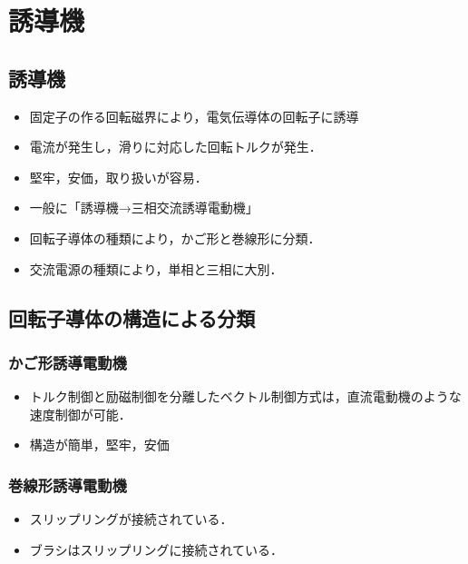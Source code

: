 \section{誘導機}
\subsection{誘導機}

\begin{classify}{}
\class
{
  \begin{classify}{}
\end{classify}
}
\end{classify}

\begin{itemize}
  \item 固定子の作る回転磁界により，電気伝導体の回転子に誘導
  \item 電流が発生し，滑りに対応した回転トルクが発生．
  \item 堅牢，安価，取り扱いが容易．
  \item 一般に「誘導機→三相交流誘導電動機」
  \item 回転子導体の種類により，かご形と巻線形に分類．
  \item 交流電源の種類により，単相と三相に大別．
\end{itemize}

\subsection{回転子導体の構造による分類}
\subsubsection{かご形誘導電動機}
\begin{itemize}
  \item トルク制御と励磁制御を分離したベクトル制御方式は，直流電動機のような速度制御が可能．
  \item 構造が簡単，堅牢，安価
\end{itemize}

\subsubsection{巻線形誘導電動機}
\begin{itemize}
  \item スリップリングが接続されている．
  \item ブラシはスリップリングに接続されている．
\end{itemize}

